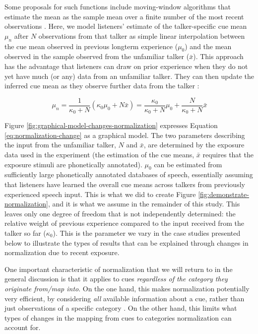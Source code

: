 \documentclass[
  11pt,
  man,floatsintext]{apa6}
\begin{document}
Some proposals for such functions include moving-window algorithms that estimate the mean as the sample mean over a finite number of the most recent observations \autocite{lee2002,zhang-peng2021}. Here, we model listeners' estimate of the talker-specific cue mean \(\mu_n\) after \(N\) observations from that talker as simple linear interpolation between the cue mean observed in previous longterm experience (\(\mu_0\)) and the mean observed in the sample observed from the unfamiliar talker (\(\bar{x}\)). This approach has the advantage that listeners can draw on prior experience when they do not yet have much (or any) data from an unfamiliar talker. They can then update the inferred cue mean as they observe further data from the talker \autocite[see discussion of the flexibility-stability trade-off in][p.~178-182]{kleinschmidt-jaeger2015}:

\begin{equation}\label{eq:normalization-change}
\mu_n = \frac{1}{\kappa_0 + N} \left( \kappa_0 \mu_0 + N \bar{x} \right) = \frac{\kappa_0}{\kappa_0 + N} \mu_0 + \frac{N}{\kappa_0 + N}\bar{x}
\end{equation}

Figure \ref{fig:graphical-model-changes-normalization} expresses Equation \eqref{eq:normalization-change} as a graphical model. The two parameters describing the input from the unfamiliar talker, \(N\) and \(\bar{x}\), are determined by the exposure data used in the experiment (the estimation of the cue means, \(\bar{x}\) requires that the exposure stimuli are phonetically annotated). \(\mu_0\) can be estimated from sufficiently large phonetically annotated databases of speech, essentially assuming that listeners have learned the overall cue means across talkers from previously experienced speech input. This is what we did to create Figure \ref{fig:demonstrate-normalization}, and it is what we assume in the remainder of this study. This leaves only one degree of freedom that is not independently determined: the relative weight of previous experience compared to the input received from the talker so far (\(\kappa_0\)). This is the parameter we vary in the case studies presented below to illustrate the types of results that can be explained through changes in normalization due to recent exposure.

One important characteristic of normalization that we will return to in the general discussion is that it applies to cues \emph{regardless of the category they originate from/map into}. On the one hand, this makes normalization potentially very efficient, by considering \emph{all} available information about a cue, rather than just observations of a specific category \autocite{apfelbaum-mcmurray2015}. On the other hand, this limits what types of changes in the mapping from cues to categories normalization can account for.
\end{document}
